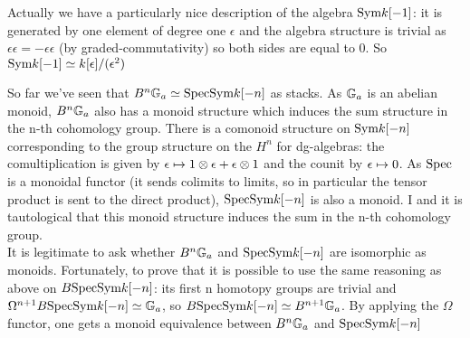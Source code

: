 \begin{refsection}
\begin{remark}
Actually we have a particularly nice description of the algebra $\text{Sym} k[-1]$: it is generated by one element of degree one $\epsilon$ and the algebra structure
is trivial as $\epsilon\epsilon=-\epsilon\epsilon$ (by graded-commutativity) so both sides are equal to 0.
So $\text{Sym} k[-1]\simeq k[\epsilon]/(\epsilon^2)$
\end{remark}

\begin{remark}
So far we've seen that $B^n\mathbb{G}_a\simeq \mathrm{Spec} \text{Sym} k[-n]$ as stacks. As $\mathbb{G}_a$ is an abelian monoid, $B^n\mathbb{G}_a$ also has a monoid structure which induces the sum structure in
the n-th cohomology group. There is a comonoid structure on $\text{Sym} k[-n]$ corresponding to the group structure on the $H^n$ for dg-algebras: the comultiplication is given by $\epsilon\mapsto 1\otimes\epsilon+\epsilon\otimes 1$
and the counit by $\epsilon\mapsto 0$. As $\mathrm{Spec}$ is a monoidal functor (it sends colimits to limits, so in particular the tensor product is sent to the
direct product), $\mathrm{Spec} \text{Sym} k[-n]$ is also a monoid. I and it is tautological that this monoid structure induces the sum in the n-th cohomology group.\\
It is legitimate to ask whether $B^n\mathbb{G}_a$ and $\mathrm{Spec}\text{Sym} k[-n]$ are isomorphic as monoids. Fortunately, to prove that it is possible to use the same reasoning as above on
$B\mathrm{Spec}\text{Sym} k[-n]$: its first n homotopy groups are trivial and $\Omega^{n+1}B\mathrm{Spec}\text{Sym} k[-n]\simeq \mathbb{G}_a$, so $B\mathrm{Spec}\text{Sym} k[-n]\simeq B^{n+1}\mathbb{G}_a$. By
applying the $\Omega$ functor, one gets a monoid equivalence between $B^n\mathbb{G}_a$ and $\mathrm{Spec}\text{Sym} k[-n]$
\end{remark}




 


\end{refsection}
